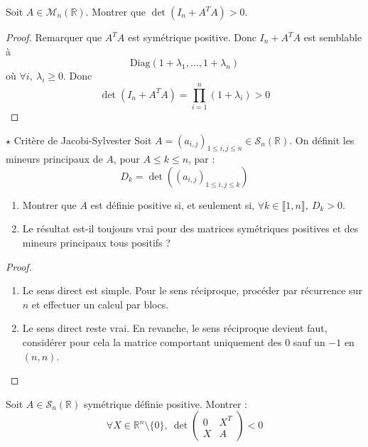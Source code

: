 \documentclass[french,a4paper]{article}
\newcommand{\R}{\mathbb{R}}
\theoremstyle{plain}
\theoremstyle{definition}
\theoremstyle{remark}
\begin{document}
\begin{ex}{}
	Soit $A\in\mathcal{M}_n(\R)$. Montrer que $\det(I_n+A^TA)>0$.
\end{ex}
\begin{proof}
	Remarquer que $A^TA$ est symétrique positive. Donc $I_n+A^TA$ est semblable à $$\text{Diag}(1+\lambda_1,\ldots,1+\lambda_n)$$ où $\forall i,\ \lambda_i\geqslant 0$. Donc $$\det(I_n+A^TA)=\prod_{i=1}^{n}(1+\lambda_i)>0$$
\end{proof}

\begin{ex}{$\star$ Critère de Jacobi-Sylvester}
	Soit $A=(a_{i,j})_{1\leqslant i,j\leqslant n}\in\mathcal{S}_n(\R)$. On définit les mineurs principaux de $A$, pour $A\leqslant k\leqslant n$, par : $$D_k=\det((a_{i,j})_{1\leqslant i,j\leqslant k})$$
	\begin{enumerate}
		\item Montrer que $A$ est définie positive si, et seulement si, $\forall k\in\llbracket1,n\rrbracket,\ D_k>0$.
		\item Le résultat est-il toujours vrai pour des matrices symétriques positives et des mineurs principaux tous positifs ?
	\end{enumerate}
\end{ex}
\begin{proof}
	\begin{enumerate}
		\item Le sens direct est simple. Pour le sens réciproque, procéder par récurrence sur $n$ et effectuer un calcul par blocs.
		\item Le sens direct reste vrai. En revanche, le sens réciproque devient faut, considérer pour cela la matrice comportant uniquement des $0$ sauf un $-1$ en $(n,n)$.
	\end{enumerate}
\end{proof}

\begin{ex}{}
	Soit $A\in\mathcal{S}_n(\R)$ symétrique définie positive. Montrer : $$\forall X\in\R^n\setminus\{0\},\ \det\begin{pmatrix}
		0&X^T\\
		X&A
	\end{pmatrix}<0$$
\end{ex}
\end{document}
